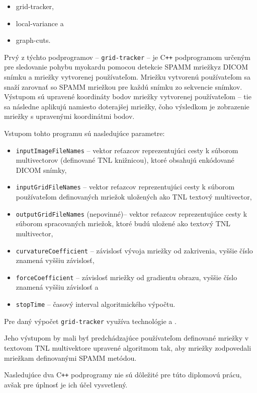\begin {itemize}
\item {grid-tracker,}
\item {local-variance a}
\item {graph-cuts.}
\end {itemize}

Prvý z týchto podprogramov -- \texttt{grid-tracker} -- je C\texttt{++} podprogramom určeným pre sledovanie pohybu myokardu pomocou detekcie SPAMM mriežky\newline z DICOM snímku a mriežky vytvorenej používateľom. Mriežku vytvorenú používateľom sa snaží zarovnať so SPAMM mriežkou pre každú snímku zo sekvencie snímkov. Výstupom sú upravené koordináty bodov mriežky vytvorenej používateľom -- tie sa následne aplikujú namiesto doterajšej mriežky, čoho výsledkom je zobrazenie mriežky s upravenými koordinátmi bodov.

Vstupom tohto programu sú nasledujúce parametre:
\begin {itemize}
\item {\texttt{inputImageFileNames} -- vektor reťazcov reprezentujúci cesty k súborom multivectorov (definované TNL knižnicou), ktoré obsahujú enkódované DICOM snímky,}
\item {\texttt{inputGridFileNames} -- vektor reťazcov reprezentujúci cesty k súborom používateľom definovaných mriežok uložených ako TNL textový multivector,}
\item {\texttt{outputGridFileNames} (nepovinné)-- vektor reťazcov reprezentujúce cesty k súborom spracovaných mriežok, ktoré budú uložené ako textový TNL multivector,}
\item {\texttt{curvatureCoefficient} -- závislosť vývoja mriežky od zakrivenia, vyššie číslo znamená vyššiu závislosť,}
\item {\texttt{forceCoefficient} -- závislosť mriežky od gradientu obrazu, vyššie číslo znamená vyššiu závislosť a}
\item {\texttt{stopTime} -- časový interval algoritmického výpočtu.}
\end {itemize}

Pre daný výpočet \texttt{grid-tracker} využíva technológie  a .

Jeho výstupom by mali byť predchádzajúce používateľom definované mriežky v textovom TNL multivektore upravené algoritmom tak, aby mriežky zodpovedali mriežkam definovanými SPAMM metódou.

Nasledujúce dva C\texttt{++} podprogramy nie sú dôležité pre túto diplomovú prácu, avšak pre úplnosť je ich účel vysvetlený.

